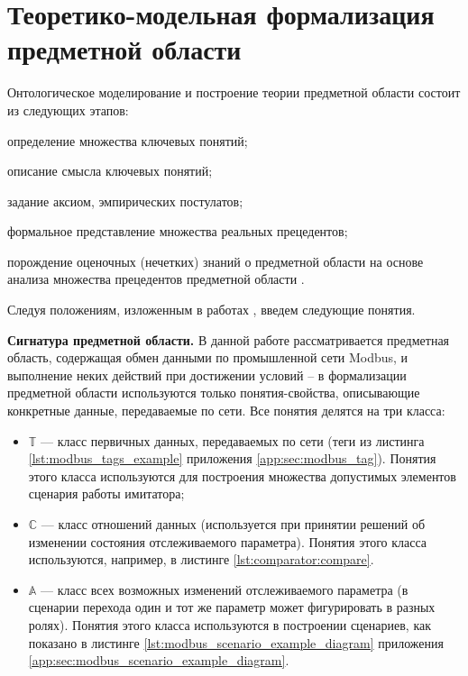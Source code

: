 


\section{Теоретико-модельная формализация предметной области}\label{sec:ontology}

Онтологическое моделирование и построение теории предметной области состоит из следующих этапов:
\begin{enumerate*}[label=\arabic*\upshape)]
    \item определение множества ключевых понятий;
    \item описание смысла ключевых понятий;
    \item задание аксиом, эмпирических постулатов;
    \item формальное представление множества реальных прецедентов;
    \item порождение оценочных (нечетких) знаний о предметной области на основе анализа множества прецедентов предметной области
        \cite{journal:philosopy_nauki:palchunov}.
\end{enumerate*}
Следуя положениям, изложенным в работах \cite{journal:vestnic_novosib:palchunov, journal:naukovedenie:serdukov},
введем следующие понятия.

\textbf{Сигнатура предметной области.}
В данной работе рассматривается предметная область, содержащая обмен данными по промышленной сети Modbus,
и выполнение неких действий при достижении условий -- в формализации предметной области используются только понятия-свойства,
описывающие конкретные данные, передаваемые по сети. Все понятия делятся на три класса:

\begin{itemize}
    \item $\mathbb{T}$ --- класс первичных данных, передаваемых по сети (теги из листинга \ref{lst:modbus_tags_example} приложения \ref{app:sec:modbus_tag}).
        Понятия этого класса используются для построения множества допустимых элементов сценария работы имитатора;
    \item $\mathbb{C}$ --- класс отношений данных (используется при принятии решений об изменении состояния отслеживаемого параметра).
        Понятия этого класса используются, например, в листинге \ref{lst:comparator:compare}.
    \item $\mathbb{A}$ --- класс всех возможных изменений отслеживаемого параметра (в сценарии перехода один и тот же параметр может фигурировать в разных ролях).
        Понятия этого класса используются в построении сценариев, как показано в листинге \ref{lst:modbus_scenario_example_diagram} приложения \ref{app:sec:modbus_scenario_example_diagram}.
\end{itemize}

